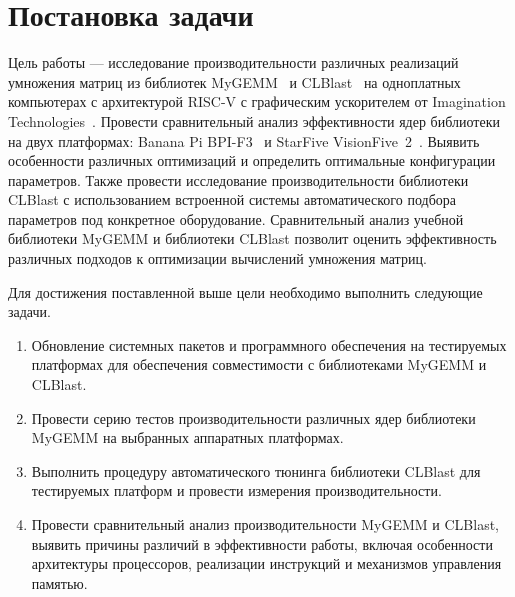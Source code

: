 
\section{Постановка задачи}
\label{sec:task}

Цель работы --- исследование производительности различных реализаций умножения матриц из библиотек MyGEMM~\cite{mygemm_repo} и CLBlast~\cite{clblast} на одноплатных компьютерах с архитектурой RISC-V с графическим ускорителем от Imagination Technologies~\cite{imagination_tech}. Провести сравнительный анализ эффективности ядер библиотеки на двух платформах: Banana Pi BPI-F3~\cite{bananapi_f3_wiki} и StarFive VisionFive~2~\cite{visionfive2_wiki}. Выявить особенности различных оптимизаций и определить оптимальные конфигурации параметров. Также провести исследование производительности библиотеки CLBlast с использованием встроенной системы автоматического подбора параметров под конкретное оборудование. Сравнительный анализ учебной библиотеки MyGEMM и библиотеки CLBlast позволит оценить эффективность различных подходов к оптимизации вычислений умножения матриц.

Для достижения поставленной выше цели необходимо выполнить следующие задачи.
\begin{enumerate}
    \item Обновление системных пакетов и программного обеспечения на тестируемых платформах для обеспечения совместимости с библиотеками MyGEMM и CLBlast.
    \item Провести серию тестов производительности различных ядер библиотеки MyGEMM на выбранных аппаратных платформах.
    \item Выполнить процедуру автоматического тюнинга библиотеки CLBlast для тестируемых платформ и провести измерения производительности.
    \item Провести сравнительный анализ производительности MyGEMM и CLBlast, выявить причины различий в эффективности работы, включая особенности архитектуры процессоров, реализации инструкций и механизмов управления памятью.
\end{enumerate}